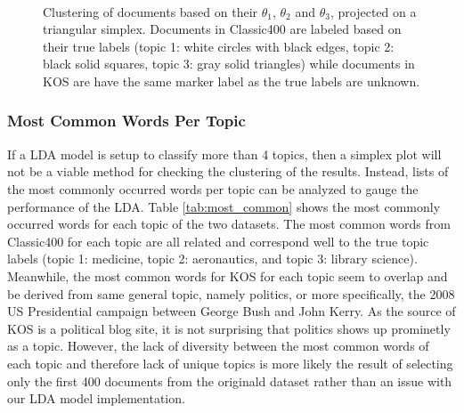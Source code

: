 \documentclass[10pt]{article}
\begin{document}
\begin{figure}[t]
    \centering
    \mbox{ \quad
        }
    \caption{Clustering of documents based on their $\theta_1$, $\theta_2$ and $\theta_3$, projected on a triangular simplex. Documents in Classic400 are labeled based on their true labels (topic 1: white circles with black edges, topic 2: black solid squares, topic 3: gray solid triangles) while documents in KOS are have the same marker label as the true labels are unknown.}
    \label{fig:cluserting}
\end{figure}


\subsubsection{Most Common Words Per Topic}
If a LDA model is setup to classify more than 4 topics, then a simplex plot will not be a viable method for checking the clustering of the results. Instead, lists of the most commonly occurred words per topic can be analyzed to gauge the performance of the LDA. Table \ref{tab:most_common} shows the most commonly occurred words for each topic of the two datasets. The most common words from Classic400 for each topic are all related and correspond well to the true topic labels (topic 1: medicine, topic 2: aeronautics, and topic 3: library science). Meanwhile, the most common words for KOS for each topic seem to overlap and be derived from same general topic, namely politics, or more specifically, the 2008 US Presidential campaign between George Bush and John Kerry. As the source of KOS is a political blog site, it is not surprising that politics shows up prominetly as a topic. However, the lack of diversity between the most common words of each topic and therefore lack of unique topics is more likely the result of selecting only the first 400 documents from the originald dataset rather than an issue with our LDA model implementation.
\end{document}
